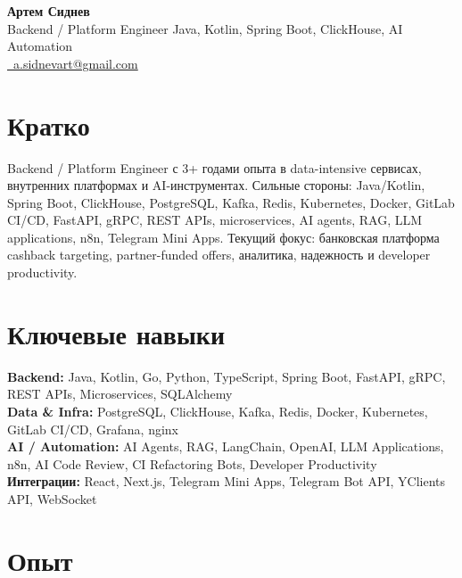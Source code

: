 \documentclass[10pt,a4paper]{article}
\newcommand{\contactsep}{\enspace\textbar\enspace}
\newcommand{\social}[2]{\href{#1}{#2}}
\begin{document}
\fontsize{8.85pt}{10.35pt}\selectfont

\begin{center}
{\LARGE \textbf{Артем Сиднев}}\\[-0.02em]
{\normalsize Backend / Platform Engineer \textbar{} Java, Kotlin, Spring Boot, ClickHouse, AI Automation}\\[0.26em]
{\footnotesize
\href{mailto:a.sidnevart@gmail.com}{\faEnvelope\ a.sidnevart@gmail.com}
\contactsep \social{https://t.me/sidnevart}{\faTelegram}
\contactsep \social{https://www.linkedin.com/in/artem-sidnev}{\faLinkedin}
\contactsep \social{https://github.com/sidnevart}{\faGithub}
\contactsep \social{https://sidnev.dev}{\faGlobe}
}
\end{center}

\vspace{0.05em}

\section*{Кратко}
Backend / Platform Engineer с 3+ годами опыта в data-intensive сервисах, внутренних платформах и AI-инструментах. Сильные стороны: Java/Kotlin, Spring Boot, ClickHouse, PostgreSQL, Kafka, Redis, Kubernetes, Docker, GitLab CI/CD, FastAPI, gRPC, REST APIs, microservices, AI agents, RAG, LLM applications, n8n, Telegram Mini Apps. Текущий фокус: банковская платформа cashback targeting, partner-funded offers, аналитика, надежность и developer productivity.

\section*{Ключевые навыки}
\textbf{Backend:} Java, Kotlin, Go, Python, TypeScript, Spring Boot, FastAPI, gRPC, REST APIs, Microservices, SQLAlchemy \\
\textbf{Data \& Infra:} PostgreSQL, ClickHouse, Kafka, Redis, Docker, Kubernetes, GitLab CI/CD, Grafana, nginx \\
\textbf{AI / Automation:} AI Agents, RAG, LangChain, OpenAI, LLM Applications, n8n, AI Code Review, CI Refactoring Bots, Developer Productivity \\
\textbf{Интеграции:} React, Next.js, Telegram Mini Apps, Telegram Bot API, YClients API, WebSocket

\section*{Опыт}
\end{document}
